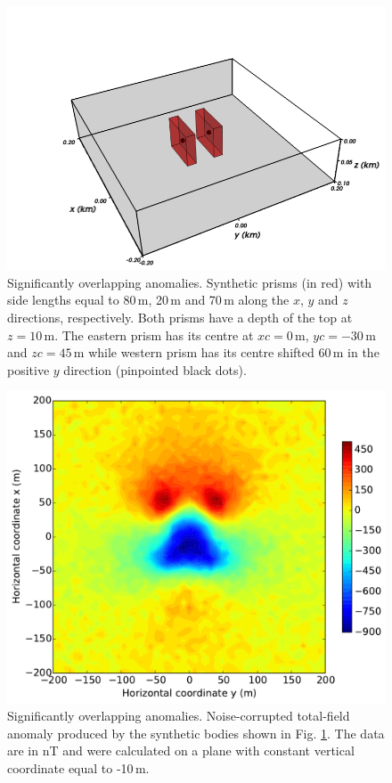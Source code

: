 \documentclass[journal abbreviation, npg]{copernicus}
\begin{document}

\begin{figure}[t]
\includegraphics[width=120mm]{Figures/npgd-2014-0069-f08}
\caption{Significantly overlapping anomalies. Synthetic prisms
(in red) with side lengths
equal to 80\,\unit{m}, 20\,\unit{m} and 70\,\unit{m} along
the $x$, $y$ and $z$ directions, respectively. Both prisms have a depth
of the top at $z = 10$\,\unit{m}. The eastern prism has its centre at 
$xc = 0$\,\unit{m}, $yc = -30$\,\unit{m} and $zc = 45$\,\unit{m} while
western prism has its centre shifted 60\,\unit{m} in the positive $y$ 
direction (pinpointed black dots).}
\label{fig:overlapping-prisms}
\end{figure}


\begin{figure}[t]
\includegraphics[width=120mm]{Figures/npgd-2014-0069-f09}
\caption{Significantly overlapping anomalies. Noise-corrupted 
total-field anomaly produced by the synthetic bodies shown in 
Fig. \ref{fig:overlapping-prisms}. The data are in nT and were
calculated on a plane with constant vertical coordinate equal to
-10\,\unit{m}.}
\label{fig:overlapping-prisms-data}
\end{figure}
\end{document}
